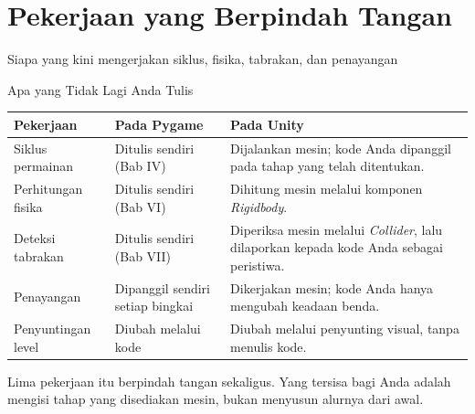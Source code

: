 \documentclass[aspectratio=169,10pt]{beamer}
\begin{document}
\section{Pekerjaan yang Berpindah Tangan}
  {Siapa yang kini mengerjakan siklus, fisika, tabrakan, dan penayangan}

\begin{frame}{Apa yang Tidak Lagi Anda Tulis}
{\scriptsize
\renewcommand{\arraystretch}{1.10}
\begin{tabularx}{\textwidth}{@{}>{\raggedright\arraybackslash}p{3.3cm}
    >{\raggedright\arraybackslash}p{4.4cm}
    >{\raggedright\arraybackslash}X@{}}
\toprule
\textbf{Pekerjaan} & \textbf{Pada Pygame} & \textbf{Pada Unity} \\
\midrule
Siklus permainan & Ditulis sendiri (Bab IV) &
  Dijalankan mesin; kode Anda dipanggil pada tahap yang telah ditentukan. \\
\addlinespace
Perhitungan fisika & Ditulis sendiri (Bab VI) &
  Dihitung mesin melalui komponen \emph{Rigidbody}. \\
\addlinespace
Deteksi tabrakan & Ditulis sendiri (Bab VII) &
  Diperiksa mesin melalui \emph{Collider}, lalu dilaporkan kepada kode Anda
  sebagai peristiwa. \\
\addlinespace
Penayangan & Dipanggil sendiri setiap bingkai &
  Dikerjakan mesin; kode Anda hanya mengubah keadaan benda. \\
\addlinespace
Penyuntingan level & Diubah melalui kode &
  Diubah melalui penyunting visual, tanpa menulis kode. \\
\bottomrule
\end{tabularx}}
\vspace{0.12cm}
\begin{kotak}
Lima pekerjaan itu berpindah tangan sekaligus. Yang tersisa bagi Anda adalah
mengisi tahap yang disediakan mesin, bukan menyusun alurnya dari awal.
\end{kotak}
\end{frame}
\end{document}
